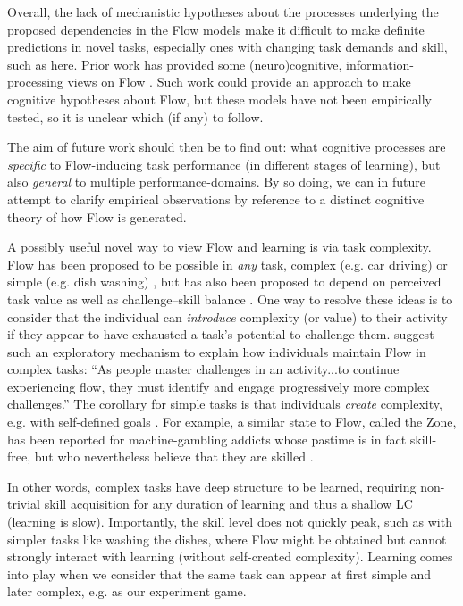 \documentclass{frontierstyle/frontiersSCNS}
\begin{document}
Overall, the lack of mechanistic hypotheses about the processes underlying the proposed dependencies in the Flow models make it difficult to make definite predictions in novel tasks, especially ones with changing task demands and skill, such as here. Prior work has provided some (neuro)cognitive, information-processing views on Flow \citep{Marr2001,Cowley2008,Simlesa2018}. Such work could provide an approach to make cognitive hypotheses about Flow, but these models have not been empirically tested, so it is unclear which (if any) to follow.

The aim of future work should then be to find out: what cognitive processes are {\it specific} to Flow-inducing task performance (in different stages of learning), but also {\it general} to multiple performance-domains. By so doing, we can in future attempt to clarify empirical observations by reference to a distinct cognitive theory of how Flow is generated.

A possibly useful novel way to view Flow and learning is via task complexity. Flow has been proposed to be possible in {\it any} task, complex (e.g. car driving) or simple (e.g. dish washing) \citep{Csikszentmihalyi1999}, but has also been proposed to depend on perceived task value as well as challenge--skill balance \citep{Keller2012}. One way to resolve these ideas is to consider that the individual can {\it introduce} complexity (or value) to their activity if they appear to have exhausted a task's potential to challenge them. \cite{Nakamura2002} suggest such an exploratory mechanism to explain how individuals maintain Flow in complex tasks: ``As people master challenges in an activity...to continue experiencing flow, they must identify and engage progressively more complex challenges.'' The corollary for simple tasks is that individuals {\it create} complexity, e.g. with self-defined goals \citep{Rauterberg1995}. For example, a similar state to Flow, called the Zone, has been reported for machine-gambling addicts whose pastime is in fact skill-free, but who nevertheless believe that they are skilled \citep{Schull2014}.

In other words, complex tasks have deep structure to be learned, requiring non-trivial skill acquisition for any duration of learning and thus a shallow LC (learning is slow). Importantly, the skill level does not quickly peak, such as with simpler tasks like washing the dishes, where Flow might be obtained but cannot strongly interact with learning (without self-created complexity). Learning comes into play when we consider that the same task can appear at first simple and later complex, e.g. as our experiment game.
\end{document}
